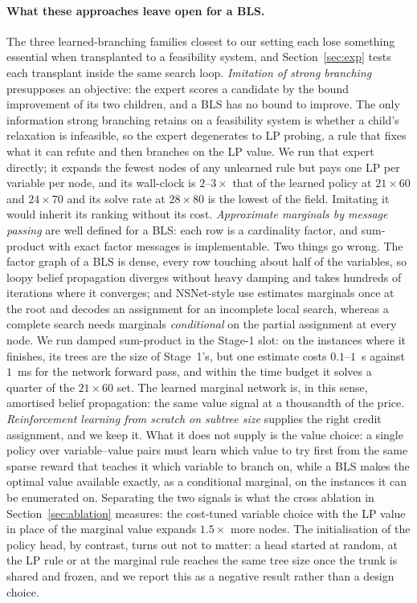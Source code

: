 \documentclass[final,5p,times,twocolumn,authoryear]{elsarticle}
\begin{document}
\paragraph{What these approaches leave open for a BLS.} The three learned-branching families closest to our setting each lose something essential when transplanted to a feasibility system, and Section~\ref{sec:exp} tests each transplant inside the same search loop.
\emph{Imitation of strong branching} \citep{khalil2016learning,gasse2019exact} presupposes an objective: the expert scores a candidate by the bound improvement of its two children, and a BLS has no bound to improve. The only information strong branching retains on a feasibility system is whether a child's relaxation is infeasible, so the expert degenerates to LP probing, a rule that fixes what it can refute and then branches on the LP value. We run that expert directly; it expands the fewest nodes of any unlearned rule but pays one LP per variable per node, and its wall-clock is $2$--$3\times$ that of the learned policy at $21\times60$ and $24\times70$ and its solve rate at $28\times80$ is the lowest of the field. Imitating it would inherit its ranking without its cost.
\emph{Approximate marginals by message passing} \citep{li2022nsnet,montanari2007solving} are well defined for a BLS: each row is a cardinality factor, and sum-product with exact factor messages is implementable. Two things go wrong. The factor graph of a BLS is dense, every row touching about half of the variables, so loopy belief propagation diverges without heavy damping and takes hundreds of iterations where it converges; and NSNet-style use estimates marginals once at the root and decodes an assignment for an incomplete local search, whereas a complete search needs marginals \emph{conditional} on the partial assignment at every node. We run damped sum-product in the Stage-1 slot: on the instances where it finishes, its trees are the size of Stage~1's, but one estimate costs $0.1$--$1$~s against $1$~ms for the network forward pass, and within the time budget it solves a quarter of the $21\times60$ set. The learned marginal network is, in this sense, amortised belief propagation: the same value signal at a thousandth of the price.
\emph{Reinforcement learning from scratch on subtree size} \citep{etheve2020reinforcement,scavuzzo2022learning} supplies the right credit assignment, and we keep it. What it does not supply is the value choice: a single policy over variable--value pairs must learn which value to try first from the same sparse reward that teaches it which variable to branch on, while a BLS makes the optimal value available exactly, as a conditional marginal, on the instances it can be enumerated on. Separating the two signals is what the cross ablation in Section~\ref{sec:ablation} measures: the cost-tuned variable choice with the LP value in place of the marginal value expands $1.5\times$ more nodes. The initialisation of the policy head, by contrast, turns out not to matter: a head started at random, at the LP rule or at the marginal rule reaches the same tree size once the trunk is shared and frozen, and we report this as a negative result rather than a design choice.
\end{document}
